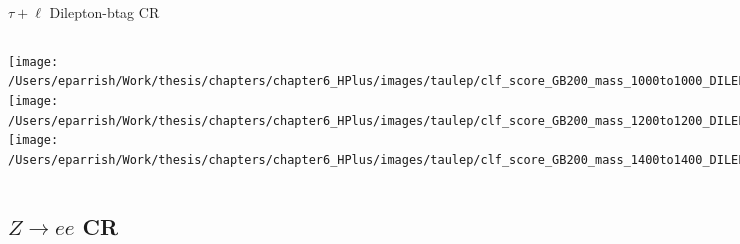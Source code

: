\documentclass[aspectratio=169,xcolor=table]{beamer}
\begin{document}
    \begin{frame}[t]{$\tau+\ell$ Dilepton-btag CR}
      \begin{columns}[t]
          \texttt{[image: /Users/eparrish/Work/thesis/chapters/chapter6\_HPlus/images/taulep/clf\_score\_GB200\_mass\_1000to1000\_DILEP\_BTAG.png]}
          \texttt{[image: /Users/eparrish/Work/thesis/chapters/chapter6\_HPlus/images/taulep/clf\_score\_GB200\_mass\_1200to1200\_DILEP\_BTAG.png]}
          \texttt{[image: /Users/eparrish/Work/thesis/chapters/chapter6\_HPlus/images/taulep/clf\_score\_GB200\_mass\_1400to1400\_DILEP\_BTAG.png]}

          \texttt{[image: /Users/eparrish/Work/thesis/chapters/chapter6\_HPlus/images/taulep/clf\_score\_GB200\_mass\_1600to1600\_DILEP\_BTAG.png]}
          \texttt{[image: /Users/eparrish/Work/thesis/chapters/chapter6\_HPlus/images/taulep/clf\_score\_GB200\_mass\_1800to1800\_DILEP\_BTAG.png]}
          \texttt{[image: /Users/eparrish/Work/thesis/chapters/chapter6\_HPlus/images/taulep/clf\_score\_GB200\_mass\_2000to2000\_DILEP\_BTAG.png]}

          \texttt{[image: /Users/eparrish/Work/thesis/chapters/chapter6\_HPlus/images/taulep/clf\_score\_GB200\_mass\_2500to2500\_DILEP\_BTAG.png]}
          \texttt{[image: /Users/eparrish/Work/thesis/chapters/chapter6\_HPlus/images/taulep/clf\_score\_GB200\_mass\_3000to3000\_DILEP\_BTAG.png]}


      \end{columns}
    \end{frame}

  \subsection{$Z \rightarrow ee$ CR}
\end{document}
